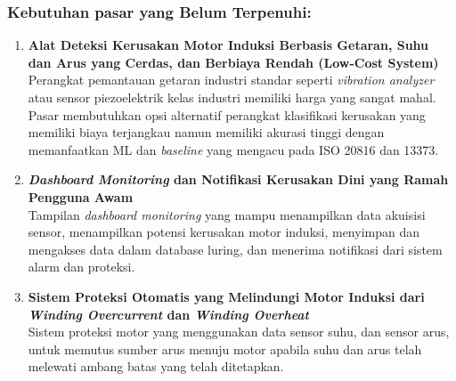 \documentclass{elsinta}
\begin{document}
\subsubsection*{Kebutuhan pasar yang Belum Terpenuhi:}
\begin{enumerate}
    \item   \textbf{Alat Deteksi Kerusakan Motor Induksi Berbasis Getaran, Suhu dan Arus yang Cerdas, dan Berbiaya Rendah (Low-Cost System)}\\
            Perangkat pemantauan getaran industri standar
            seperti \textit{vibration analyzer} atau sensor
            piezoelektrik kelas industri memiliki harga yang
            sangat mahal. Pasar membutuhkan opsi alternatif
            perangkat klasifikasi kerusakan yang memiliki biaya terjangkau
            namun memiliki akurasi tinggi dengan memanfaatkan ML dan \textit{baseline} yang mengacu
            pada ISO 20816 dan 13373.
    \item   \textbf{\textit{Dashboard Monitoring} dan Notifikasi Kerusakan Dini yang Ramah Pengguna Awam}\\
            Tampilan \textit{dashboard monitoring} yang mampu menampilkan data akuisisi sensor,
            menampilkan potensi kerusakan motor induksi, menyimpan dan mengakses data dalam database luring,
            dan menerima notifikasi dari sistem alarm dan proteksi. 
    \item   \textbf{Sistem Proteksi Otomatis yang Melindungi Motor Induksi dari \textit{Winding Overcurrent} dan \textit{Winding Overheat}}\\
            Sistem proteksi motor yang menggunakan data sensor suhu, dan sensor arus, untuk
            memutus sumber arus menuju motor apabila suhu dan arus telah melewati
            ambang batas yang telah ditetapkan.
\end{enumerate}

\subsection{\ValuePropTitle}

\end{document}
